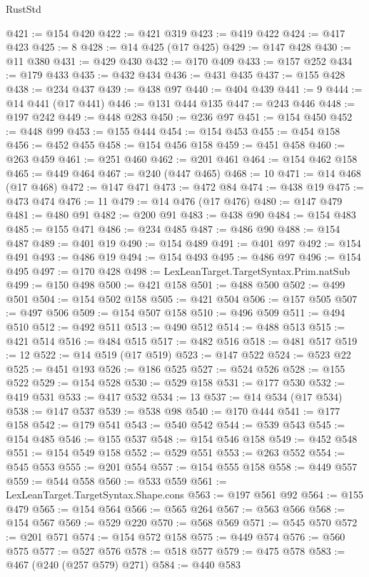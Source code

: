 \begin{lexlean}{RustStd}
\begin{coremodule}
@421 := @154 @420
@422 := @421 @319
@423 := @419 @422
@424 := @417 @423
@425 := 8
@428 := @14 @425 (@17 @425)
@429 := @147 @428
@430 := @11 @380
@431 := @429 @430
@432 := @170 @409
@433 := @157 @252
@434 := @179 @433
@435 := @432 @434
@436 := @431 @435
@437 := @155 @428
@438 := @234 @437
@439 := @438 @97
@440 := @404 @439
@441 := 9
@444 := @14 @441 (@17 @441)
@446 := @131 @444 @135
@447 := @243 @446
@448 := @197 @242
@449 := @448 @283
@450 := @236 @97
@451 := @154 @450
@452 := @448 @99
@453 := @155 @444
@454 := @154 @453
@455 := @454 @158
@456 := @452 @455
@458 := @154 @456 @158
@459 := @451 @458
@460 := @263 @459
@461 := @251 @460
@462 := @201 @461
@464 := @154 @462 @158
@465 := @449 @464
@467 := @240 (@447 @465)
@468 := 10
@471 := @14 @468 (@17 @468)
@472 := @147 @471
@473 := @472 @84
@474 := @438 @19
@475 := @473 @474
@476 := 11
@479 := @14 @476 (@17 @476)
@480 := @147 @479
@481 := @480 @91
@482 := @200 @91
@483 := @438 @90
@484 := @154 @483
@485 := @155 @471
@486 := @234 @485
@487 := @486 @90
@488 := @154 @487
@489 := @401 @19
@490 := @154 @489
@491 := @401 @97
@492 := @154 @491
@493 := @486 @19
@494 := @154 @493
@495 := @486 @97
@496 := @154 @495
@497 := @170 @428
@498 := LexLeanTarget.TargetSyntax.Prim.natSub
@499 := @150 @498
@500 := @421 @158
@501 := @488 @500
@502 := @499 @501
@504 := @154 @502 @158
@505 := @421 @504
@506 := @157 @505
@507 := @497 @506
@509 := @154 @507 @158
@510 := @496 @509
@511 := @494 @510
@512 := @492 @511
@513 := @490 @512
@514 := @488 @513
@515 := @421 @514
@516 := @484 @515
@517 := @482 @516
@518 := @481 @517
@519 := 12
@522 := @14 @519 (@17 @519)
@523 := @147 @522
@524 := @523 @22
@525 := @451 @193
@526 := @186 @525
@527 := @524 @526
@528 := @155 @522
@529 := @154 @528
@530 := @529 @158
@531 := @177 @530
@532 := @419 @531
@533 := @417 @532
@534 := 13
@537 := @14 @534 (@17 @534)
@538 := @147 @537
@539 := @538 @98
@540 := @170 @444
@541 := @177 @158
@542 := @179 @541
@543 := @540 @542
@544 := @539 @543
@545 := @154 @485
@546 := @155 @537
@548 := @154 @546 @158
@549 := @452 @548
@551 := @154 @549 @158
@552 := @529 @551
@553 := @263 @552
@554 := @545 @553
@555 := @201 @554
@557 := @154 @555 @158
@558 := @449 @557
@559 := @544 @558
@560 := @533 @559
@561 := LexLeanTarget.TargetSyntax.Shape.cons
@563 := @197 @561 @92
@564 := @155 @479
@565 := @154 @564
@566 := @565 @264
@567 := @563 @566
@568 := @154 @567
@569 := @529 @220
@570 := @568 @569
@571 := @545 @570
@572 := @201 @571
@574 := @154 @572 @158
@575 := @449 @574
@576 := @560 @575
@577 := @527 @576
@578 := @518 @577
@579 := @475 @578
@583 := @467 (@240 (@257 @579) @271)
@584 := @440 @583

\end{coremodule}
\end{lexlean}
